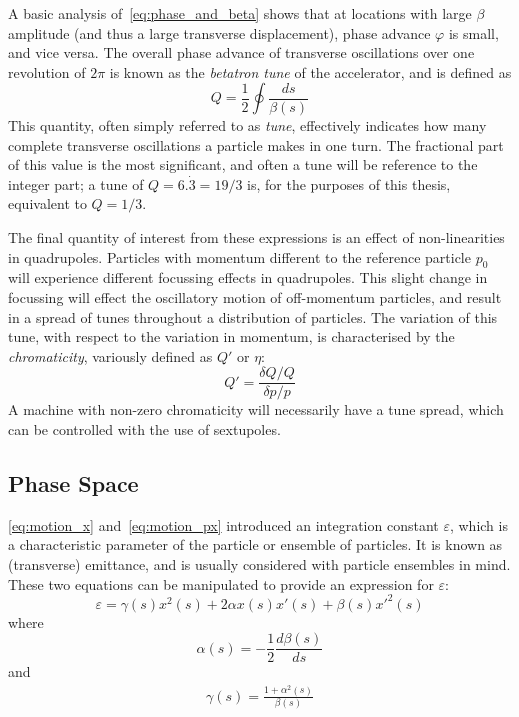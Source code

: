 \documentclass[11pt]{report}
\begin{document}
A basic analysis of~\eqref{eq:phase_and_beta} shows that at locations with large $\beta$ amplitude (and thus a large transverse displacement), phase advance $\varphi$ is small, and vice versa. The overall phase advance of transverse oscillations over one revolution of $2\pi$ is known as the \textit{betatron tune} of the accelerator, and is defined as
\begin{equation}
  Q=\frac12\oint\frac{ds}{\beta(s)}
  \label{eq:betatron_tune}
\end{equation}
This quantity, often simply referred to as \textit{tune}, effectively indicates how many complete transverse oscillations a particle makes in one turn. The fractional part of this value is the most significant, and often a tune will be reference to the integer part; a tune of $Q=6.\dot 3=19/3$ is, for the purposes of this thesis, equivalent to $Q=1/3$.

The final quantity of interest from these expressions is an effect of non-linearities in quadrupoles. Particles with momentum different to the reference particle $p_0$ will experience different focussing effects in quadrupoles. This slight change in focussing will effect the oscillatory motion of off-momentum particles, and result in a spread of tunes throughout a distribution of particles. The variation of this tune, with respect to the variation in momentum, is characterised by the \textit{chromaticity}, variously defined as $Q'$ or $\eta$:
\begin{equation}
  Q' = \frac{\delta Q/Q}{\delta p/p}
  \label{eq:chroma}
\end{equation}
A machine with non-zero chromaticity will necessarily have a tune spread, which can be controlled with the use of sextupoles.



\subsection{Phase Space}\label{subsec:trans_phase_space}

\autoref{eq:motion_x} and~\autoref{eq:motion_px} introduced an integration constant $\varepsilon$, which is a characteristic parameter of the particle or ensemble of particles. It is known as (transverse) emittance, and is usually considered with particle ensembles in mind. These two equations can be manipulated to provide an expression for $\varepsilon$:
\begin{equation}
  \varepsilon = \gamma(s)x^2(s)+2\alpha x(s)x'(s)+\beta(s)x'^2(s)
  \label{eq:emittance}
\end{equation} where 
\begin{equation}
  \alpha(s) = -\frac12\frac{d\beta(s)}{ds}
  \label{eq:alpha}
\end{equation} and
\begin{eqnarray}
  \gamma(s) = \frac{1+\alpha^2(s)}{\beta(s)}
  \label{eq:gamma}
\end{eqnarray}
\end{document}
